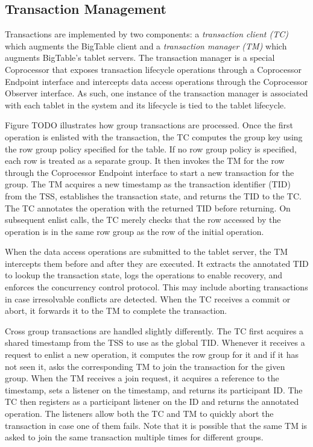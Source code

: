 \documentclass[10pt,final,journal]{IEEEtran}
\begin{document}
\subsection{Transaction Management}
Transactions are implemented by two components: a \emph{transaction client (TC)} which augments the BigTable client and a \emph{transaction manager (TM)} which augments BigTable's tablet servers. The transaction manager is a special Coprocessor that exposes transaction lifecycle operations through a Coprocessor Endpoint interface and intercepts data access operations through the Coprocessor Observer interface. As such, one instance of the transaction manager is associated with each tablet in the system and its lifecycle is tied to the tablet lifecycle.


Figure TODO illustrates how group transactions are processed. Once the first operation is enlisted with the transaction, the TC computes the group key using the row group policy specified for the table. If no row group policy is specified, each row is treated as a separate group. It then invokes the TM for the row through the Coprocessor Endpoint interface to start a new transaction for the group. The TM acquires a new timestamp as the transaction identifier (TID) from the TSS, establishes the transaction state, and returns the TID to the TC. The TC annotates the operation with the returned TID before returning. On subsequent enlist calls, the TC merely checks that the row accessed by the operation is in the same row group as the row of the initial operation.

When the data access operations are submitted to the tablet server, the TM intercepts them before and after they are executed. It extracts the annotated TID to lookup the transaction state, logs the operations to enable recovery, and enforces the concurrency control protocol. This may include aborting transactions in case irresolvable conflicts are detected. When the TC receives a commit or abort, it forwards it to the TM to complete the transaction.

Cross group transactions are handled slightly differently. The TC first acquires a shared timestamp from the TSS to use as the global TID. Whenever it receives a request to enlist a new operation, it computes the row group for it and if it has not seen it, asks the corresponding TM to join the transaction for the given group. When the TM receives a join request, it acquires a reference to the timestamp, sets a listener on the timestamp, and returns its participant ID. The TC then registers as a participant listener on the ID and returns the annotated operation. The listeners allow both the TC and TM to quickly abort the transaction in case one of them fails. Note that it is possible that the same TM is asked to join the same transaction multiple times for different groups.
\end{document}
